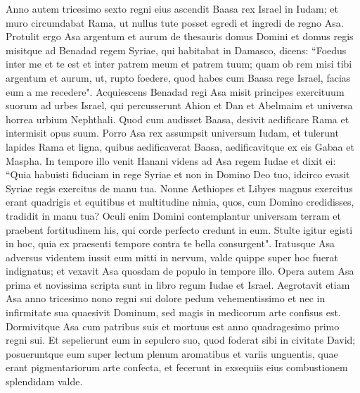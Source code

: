 \begin{biblechapter}  
\verse Anno autem tricesimo sexto regni eius ascendit Baasa rex Israel in Iudam; et muro circumdabat Rama, ut nullus tute posset egredi et ingredi de regno Asa. 
\verse Protulit ergo Asa argentum et aurum de thesauris domus Domini et domus regis misitque ad Benadad regem Syriae, qui habitabat in Damasco, dicens: 
\verse “Foedus inter me et te est et inter patrem meum et patrem tuum; quam ob rem misi tibi argentum et aurum, ut, rupto foedere, quod habes cum Baasa rege Israel, facias eum a me recedere". 
\verse Acquiescens Benadad regi Asa misit principes exercituum suorum ad urbes Israel, qui percusserunt Ahion et Dan et Abelmaim et universa horrea urbium Nephthali. 
\verse Quod cum audisset Baasa, desivit aedificare Rama et intermisit opus suum. 
\verse Porro Asa rex assumpsit universum Iudam, et tulerunt lapides Rama et ligna, quibus aedificaverat Baasa, aedificavitque ex eis Gabaa et Maspha. 
\verse In tempore illo venit Hanani videns ad Asa regem Iudae et dixit ei: “Quia habuisti fiduciam in rege Syriae et non in Domino Deo tuo, idcirco evasit Syriae regis exercitus de manu tua. 
\verse Nonne Aethiopes et Libyes magnus exercitus erant quadrigis et equitibus et multitudine nimia, quos, cum Domino credidisses, tradidit in manu tua? 
\verse Oculi enim Domini contemplantur universam terram et praebent fortitudinem his, qui corde perfecto credunt in eum. Stulte igitur egisti in hoc, quia ex praesenti tempore contra te bella consurgent". 
\verse Iratusque Asa adversus videntem iussit eum mitti in nervum, valde quippe super hoc fuerat indignatus; et vexavit Asa quosdam de populo in tempore illo. 
\verse Opera autem Asa prima et novissima scripta sunt in libro regum Iudae et Israel. 
\verse Aegrotavit etiam Asa anno tricesimo nono regni sui dolore pedum vehementissimo et nec in infirmitate sua quaesivit Dominum, sed magis in medicorum arte confisus est. 
\verse Dormivitque Asa cum patribus suis et mortuus est anno quadragesimo primo regni sui. 
\verse Et sepelierunt eum in sepulcro suo, quod foderat sibi in civitate David; posueruntque eum super lectum plenum aromatibus et variis unguentis, quae erant pigmentariorum arte confecta, et fecerunt in exsequiis eius combustionem splendidam valde. 
\end{biblechapter}

